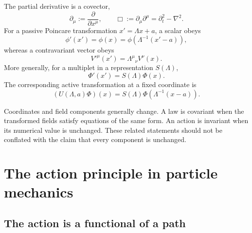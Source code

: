 \documentclass[11pt]{article}
\begin{document}
The partial derivative is a covector,
\begin{equation}
  \partial_\mu:=\frac{\partial}{\partial x^\mu},
  \qquad
  \Box:=\partial_\mu\partial^\mu
  =\partial_t^2-\nabla^2.
\end{equation}
For a passive Poincare transformation \(x'=\Lambda x+a\), a scalar obeys
\begin{equation}
  \phi'(x')=\phi(x)
  =\phi\!\left(\Lambda^{-1}(x'-a)\right),
  \label{eq:scalarPassive}
\end{equation}
whereas a contravariant vector obeys
\begin{equation}
  V'^\mu(x')=\Lambda^\mu{}_\nu V^\nu(x).
  \label{eq:vectorPassive}
\end{equation}
More generally, for a multiplet in a representation \(S(\Lambda)\),
\begin{equation}
  \Phi'(x')=S(\Lambda)\Phi(x).
  \label{eq:generalPassive}
\end{equation}
The corresponding active transformation at a fixed coordinate is
\begin{equation}
  (U(\Lambda,a)\Phi)(x)
  =S(\Lambda)\Phi\!\left(\Lambda^{-1}(x-a)\right).
  \label{eq:generalActive}
\end{equation}

\begin{remarkbox}
Coordinates and field components generally change. A law is covariant when
the transformed fields satisfy equations of the same form. An action is
invariant when its numerical value is unchanged. These related statements
should not be conflated with the claim that every component is unchanged.
\end{remarkbox}

\section{The action principle in particle mechanics}

\subsection{The action is a functional of a path}
\end{document}
